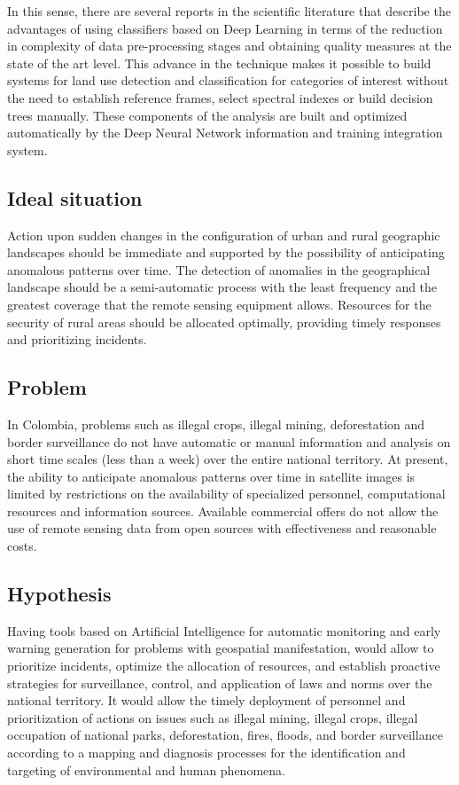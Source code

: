 \documentclass{article}
\begin{document}
In this sense, there are several reports in the scientific literature that describe the advantages of using classifiers based on Deep Learning in terms of the reduction in complexity of data pre-processing stages and obtaining quality measures at the state of the art level. This advance in the technique makes it possible to build systems for land use detection and classification for categories of interest without the need to establish reference frames, select spectral indexes or build decision trees manually. These components of the analysis are built and optimized automatically by the Deep Neural Network information and training integration system.\\
\subsection{Ideal situation}
Action upon sudden changes in the configuration of urban and rural geographic landscapes should be immediate and supported by the possibility of anticipating anomalous patterns over time. The detection of anomalies in the geographical landscape should be a semi-automatic process with the least frequency and the greatest coverage that the remote sensing equipment allows. Resources for the security of rural areas should be allocated optimally, providing timely responses and prioritizing incidents.\\

\subsection{Problem}
In Colombia, problems such as illegal crops, illegal mining, deforestation and border surveillance do not have automatic or manual information and analysis on short time scales (less than a week) over the entire national territory. At present, the ability to anticipate anomalous patterns over time in satellite images is limited by restrictions on the availability of specialized personnel, computational resources and information sources. Available commercial offers do not allow the use of remote sensing data from open sources with effectiveness and reasonable costs.\\

\subsection{Hypothesis}
Having tools based on Artificial Intelligence for automatic monitoring and early warning generation for problems with geospatial manifestation, would allow to prioritize incidents, optimize the allocation of resources, and establish proactive strategies for surveillance, control, and application of laws and norms over the national territory. It would allow the timely deployment of personnel and prioritization of actions on issues such as illegal mining, illegal crops, illegal occupation of national parks, deforestation, fires, floods, and border surveillance according to a mapping and diagnosis processes for the identification and targeting of environmental and human phenomena.\\
\end{document}
